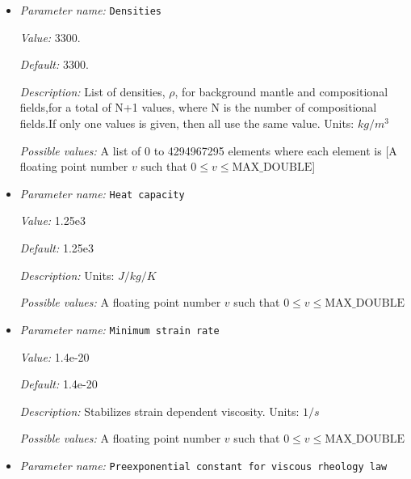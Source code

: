 \begin{itemize}
{\it Value:} 117


{\it Default:} 117


{\it Description:} ($\tau_0$). Units: $Pa$


{\it Possible values:} A floating point number $v$ such that $0 \leq v \leq \text{MAX\_DOUBLE}$
\item {\it Parameter name:} {\tt Densities}
\label{parameters:Material model/Morency and Doin/Densities}


{\it Value:} 3300.


{\it Default:} 3300.


{\it Description:} List of densities, $\rho$, for background mantle and compositional fields,for a total of N+1 values, where N is the number of compositional fields.If only one values is given, then all use the same value.  Units: $kg / m^3$


{\it Possible values:} A list of 0 to 4294967295 elements where each element is [A floating point number $v$ such that $0 \leq v \leq \text{MAX\_DOUBLE}$]
\item {\it Parameter name:} {\tt Heat capacity}
\label{parameters:Material model/Morency and Doin/Heat capacity}


{\it Value:} 1.25e3


{\it Default:} 1.25e3


{\it Description:} Units: $J/kg/K$


{\it Possible values:} A floating point number $v$ such that $0 \leq v \leq \text{MAX\_DOUBLE}$
\item {\it Parameter name:} {\tt Minimum strain rate}
\label{parameters:Material model/Morency and Doin/Minimum strain rate}


{\it Value:} 1.4e-20


{\it Default:} 1.4e-20


{\it Description:} Stabilizes strain dependent viscosity. Units: $1 / s$


{\it Possible values:} A floating point number $v$ such that $0 \leq v \leq \text{MAX\_DOUBLE}$
\item {\it Parameter name:} {\tt Preexponential constant for viscous rheology law}
\label{parameters:Material model/Morency and Doin/Preexponential constant for viscous rheology law}



\end{itemize}
